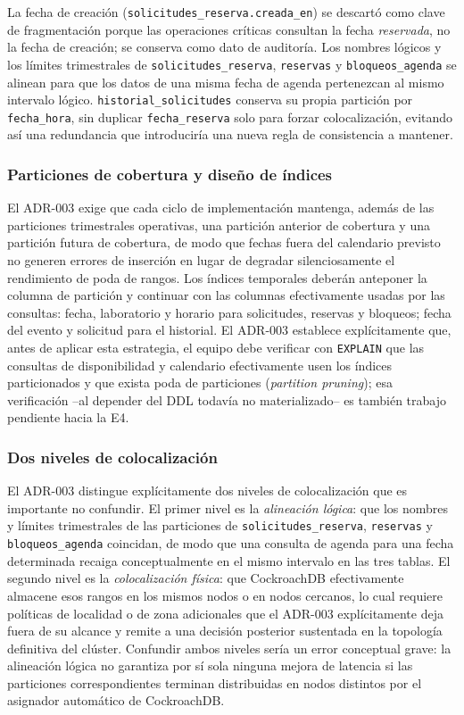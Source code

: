 \documentclass[10pt,twocolumn]{article}
\begin{document}
La fecha de creación (\texttt{solicitudes\_reserva.}\allowbreak\texttt{creada\_en}) se descartó
como clave de fragmentación porque las operaciones críticas consultan la
fecha \emph{reservada}, no la fecha de creación; se conserva como dato de
auditoría. Los nombres lógicos y los límites trimestrales de
\texttt{solicitudes\_reserva}, \texttt{reservas} y \texttt{bloqueos\_agenda}
se alinean para que los datos de una misma fecha de agenda pertenezcan al
mismo intervalo lógico. \texttt{historial\_solicitudes} conserva su propia
partición por \texttt{fecha\_hora}, sin duplicar \texttt{fecha\_reserva}
solo para forzar colocalización, evitando así una redundancia que
introduciría una nueva regla de consistencia a mantener.

\subsubsection{Particiones de cobertura y diseño de índices}

El ADR-003 exige que cada ciclo de implementación mantenga, además de las
particiones trimestrales operativas, una partición anterior de cobertura y
una partición futura de cobertura, de modo que fechas fuera del calendario
previsto no generen errores de inserción en lugar de degradar
silenciosamente el rendimiento de poda de rangos. Los índices temporales
deberán anteponer la columna de partición y continuar con las columnas
efectivamente usadas por las consultas: fecha, laboratorio y horario para
solicitudes, reservas y bloqueos; fecha del evento y solicitud para el
historial. El ADR-003 establece explícitamente que, antes de aplicar esta
estrategia, el equipo debe verificar con \texttt{EXPLAIN} que las consultas
de disponibilidad y calendario efectivamente usen los índices particionados
y que exista poda de particiones (\emph{partition pruning}); esa
verificación --al depender del DDL todavía no materializado-- es también
trabajo pendiente hacia la E4.

\subsubsection{Dos niveles de colocalización}

El ADR-003 distingue explícitamente dos niveles de colocalización que es
importante no confundir. El primer nivel es la \emph{alineación lógica}:
que los nombres y límites trimestrales de las particiones de
\texttt{solicitudes\_reserva}, \texttt{reservas} y \texttt{bloqueos\_agenda}
coincidan, de modo que una consulta de agenda para una fecha determinada
recaiga conceptualmente en el mismo intervalo en las tres tablas. El
segundo nivel es la \emph{colocalización física}: que CockroachDB
efectivamente almacene esos rangos en los mismos nodos o en nodos cercanos,
lo cual requiere políticas de localidad o de zona adicionales que el
ADR-003 explícitamente deja fuera de su alcance y remite a una decisión
posterior sustentada en la topología definitiva del clúster. Confundir
ambos niveles sería un error conceptual grave: la alineación lógica no
garantiza por sí sola ninguna mejora de latencia si las particiones
correspondientes terminan distribuidas en nodos distintos por el
asignador automático de CockroachDB.
\end{document}

